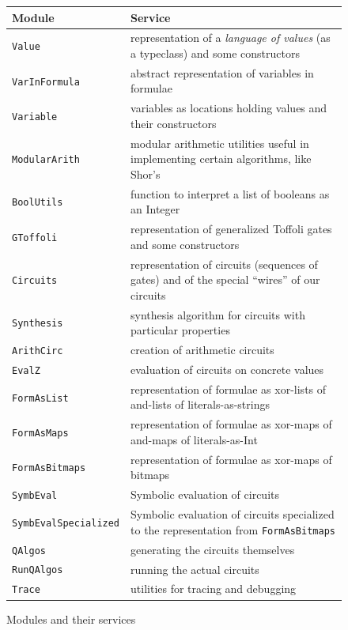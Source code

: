 \documentclass[sigplan,screen]{acmart}
\theoremstyle{definition}
\begin{document}
\begin{figure}[t]
\begin{tabular}{l | p{13cm}}
  \textbf{Module} & \textbf{Service} \\ \hline
  \texttt{Value} & representation of a \emph{language of values}
    (as a typeclass) and some constructors\\
  \texttt{VarInFormula} & abstract representation of variables in formulae\\
  \texttt{Variable} & variables as locations holding values and
    their constructors\\
  \texttt{ModularArith} & modular arithmetic utilities useful in
    implementing certain algorithms, like Shor's\\
  \texttt{BoolUtils} & function to interpret a list of booleans as
    an Integer\\
  \texttt{GToffoli} & representation of generalized Toffoli gates
    and some constructors\\
  \texttt{Circuits} & representation of circuits (sequences of gates)
    and of the special ``wires'' of our circuits\\
  \texttt{Synthesis} & synthesis algorithm for circuits with particular
    properties\\
  \texttt{ArithCirc} & creation of arithmetic circuits\\
  \texttt{EvalZ} & evaluation of circuits on concrete values\\
  \texttt{FormAsList} & representation of formulae as xor-lists
    of and-lists of literals-as-strings\\
  \texttt{FormAsMaps} & representation of formulae as xor-maps
    of and-maps of literals-as-Int\\
  \texttt{FormAsBitmaps} & representation of formulae as xor-maps
    of bitmaps\\
  \texttt{SymbEval} & Symbolic evaluation of circuits\\
  \texttt{SymbEvalSpecialized} & Symbolic evaluation of circuits
    specialized to the representation from \texttt{FormAsBitmaps}\\
  \texttt{QAlgos} & generating the circuits themselves\\
  \texttt{RunQAlgos} & running the actual circuits \\
  \texttt{Trace} & utilities for tracing and debugging
\end{tabular}
  \caption{Modules and their services}
  \label{fig:modules}
\end{figure}
\end{document}
